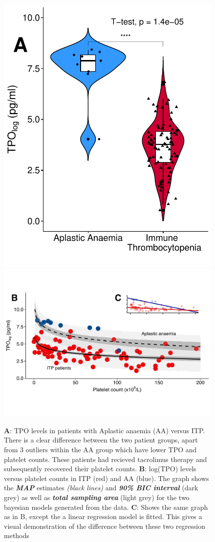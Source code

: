 \documentclass[landscape,a0paper,fontscale=0.285]{beamer} %
\newlength{\twocolwid}
\begin{document}
\begin{frame}[t]
\begin{columns}[t]
\begin{column}{\twocolwid}
\begin{figure}%
    \centering
    {{\includegraphics[width=0.29\linewidth]{fig/AA_vs_ITP_2.pdf}}}%
    \qquad
    {{\includegraphics[width=0.67\linewidth]{fig/bayes_model2.pdf}}}%
    \caption{\textbf{A}: TPO levels in patients with Aplastic anaemia (AA) versus ITP. There is a clear difference between the two patient groups, apart from 3 outliers within the AA group which have lower TPO and platelet counts. These patients had recieved tacrolimus therapy and subsequently recovered their platelet counts. \textbf{B}: log(TPO) levels versus platelet counts in ITP (red) and AA (blue). The graph shows the \textit{\textbf{MAP}} estimates \emph{(black lines)} and \textit{\textbf{90\% BIC interval}} (dark grey) as well as \textit{\textbf{total sampling area}} (light grey) for the two bayesian models generated from the data. \textbf{C}: Shows the same graph as in B, except the a linear regression model is fitted. This gives a visual demonstration of the difference between these two regression methods}%
    \label{fig:example}%
\end{figure}








\end{column}
\end{columns}
\end{frame}
\end{document}
